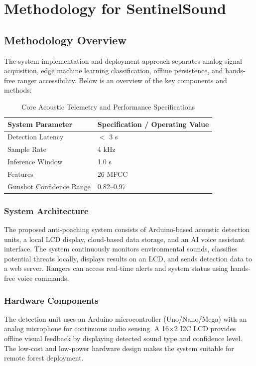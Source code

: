 \documentclass[11pt,a4paper,oneside]{report}
\begin{document}
\chapter{Methodology for SentinelSound}

\section{Methodology Overview}
The system implementation and deployment approach separates analog signal acquisition, edge machine learning classification, offline persistence, and hands-free ranger accessibility. Below is an overview of the key components and methods:

\begin{table}[H]
    \centering
    \caption{Core Acoustic Telemetry and Performance Specifications}
    \label{tab:system_specs}
    \begin{tabular}{ll}
        \toprule
        \textbf{System Parameter} & \textbf{Specification / Operating Value} \\
        \midrule
        Detection Latency & $<$ 3 s \\
        Sample Rate & 4 kHz \\
        Inference Window & 1.0 s \\
        Features & 26 MFCC \\
        Gunshot Confidence Range & 0.82--0.97 \\
        \bottomrule
    \end{tabular}
\end{table}

\subsection{System Architecture}
The proposed anti-poaching system consists of Arduino-based acoustic detection units, a local LCD display, cloud-based data storage, and an AI voice assistant interface. The system continuously monitors environmental sounds, classifies potential threats locally, displays results on an LCD, and sends detection data to a web server. Rangers can access real-time alerts and system status using hands-free voice commands.

\subsection{Hardware Components}
The detection unit uses an Arduino microcontroller (Uno/Nano/Mega) with an analog microphone for continuous audio sensing. A 16$\times$2 I2C LCD provides offline visual feedback by displaying detected sound type and confidence level. The low-cost and low-power hardware design makes the system suitable for remote forest deployment.
\end{document}
